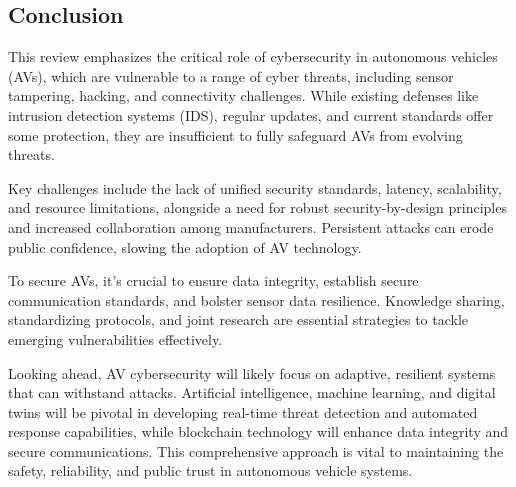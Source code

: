 \subsection{Conclusion}\label{subsec:conclusion}
This review emphasizes the critical role of cybersecurity in autonomous vehicles (AVs), which are vulnerable to a range of cyber threats, including sensor tampering, hacking, and connectivity challenges.
While existing defenses like intrusion detection systems (IDS), regular updates, and current standards offer some protection, they are insufficient to fully safeguard AVs from evolving threats.

Key challenges include the lack of unified security standards, latency, scalability, and resource limitations, alongside a need for robust security-by-design principles and increased collaboration among manufacturers.
Persistent attacks can erode public confidence, slowing the adoption of AV technology.

To secure AVs, it's crucial to ensure data integrity, establish secure communication standards, and bolster sensor data resilience.
Knowledge sharing, standardizing protocols, and joint research are essential strategies to tackle emerging vulnerabilities effectively.

Looking ahead, AV cybersecurity will likely focus on adaptive, resilient systems that can withstand attacks.
Artificial intelligence, machine learning, and digital twins will be pivotal in developing real-time threat detection and automated response capabilities,
while blockchain technology will enhance data integrity and secure communications.
This comprehensive approach is vital to maintaining the safety, reliability, and public trust in autonomous vehicle systems.